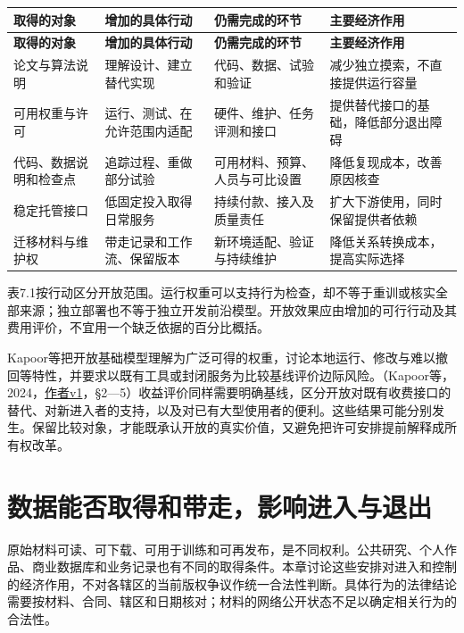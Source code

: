 \documentclass[UTF8,fontset=windows,12pt,a4paper,oneside,openany]{ctexbook}
\begin{document}
\begingroup\footnotesize\setlength{\tabcolsep}{4pt}\renewcommand{\arraystretch}{1.25}
\begin{longtable}{>{\raggedright\arraybackslash}p{}>{\raggedright\arraybackslash}p{}>{\raggedright\arraybackslash}p{}>{\raggedright\arraybackslash}p{}}
\toprule
\textbf{取得的对象} & \textbf{增加的具体行动} & \textbf{仍需完成的环节} & \textbf{主要经济作用} \\
\midrule\endfirsthead
\toprule
\textbf{取得的对象} & \textbf{增加的具体行动} & \textbf{仍需完成的环节} & \textbf{主要经济作用} \\
\midrule\endhead
\bottomrule\endfoot
论文与算法说明 & 理解设计、建立替代实现 & 代码、数据、试验和验证 & 减少独立摸索，不直接提供运行容量 \\
可用权重与许可 & 运行、测试、在允许范围内适配 & 硬件、维护、任务评测和接口 & 提供替代接口的基础，降低部分退出障碍 \\
代码、数据说明和检查点 & 追踪过程、重做部分试验 & 可用材料、预算、人员与可比设置 & 降低复现成本，改善原因核查 \\
稳定托管接口 & 低固定投入取得日常服务 & 持续付款、接入及质量责任 & 扩大下游使用，同时保留提供者依赖 \\
迁移材料与维护权 & 带走记录和工作流、保留版本 & 新环境适配、验证与持续维护 & 降低关系转换成本，提高实际选择 \\
\end{longtable}\endgroup


表7.1按行动区分开放范围。运行权重可以支持行为检查，却不等于重训或核实全部来源；独立部署也不等于独立开发前沿模型。开放效果应由增加的可行行动及其费用评价，不宜用一个缺乏依据的百分比概括。

Kapoor等把开放基础模型理解为广泛可得的权重，讨论本地运行、修改与难以撤回等特性，并要求以既有工具或封闭服务为比较基线评价边际风险。（Kapoor等，2024，\href{https://arxiv.org/html/2403.07918v1}{作者v1}，§2—5）收益评价同样需要明确基线，区分开放对既有收费接口的替代、对新进入者的支持，以及对已有大型使用者的便利。这些结果可能分别发生。保留比较对象，才能既承认开放的真实价值，又避免把许可安排提前解释成所有权改革。

\section{数据能否取得和带走，影响进入与退出}

原始材料可读、可下载、可用于训练和可再发布，是不同权利。公共研究、个人作品、商业数据库和业务记录也有不同的取得条件。本章讨论这些安排对进入和控制的经济作用，不对各辖区的当前版权争议作统一合法性判断。具体行为的法律结论需要按材料、合同、辖区和日期核对；材料的网络公开状态不足以确定相关行为的合法性。
\end{document}
